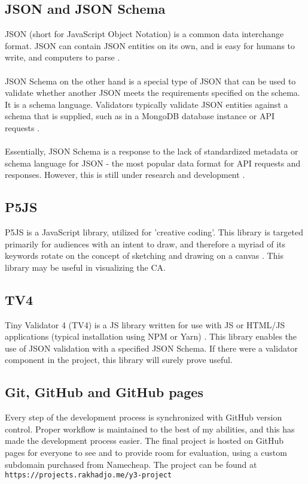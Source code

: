 \subsection{JSON and JSON Schema} \label{json_schema}
JSON (short for JavaScript Object Notation) is a common data interchange format. JSON can contain JSON entities on its own, and is easy for humans to write, and computers to parse \cite{bassett2015introduction}.
\\ \\
JSON Schema on the other hand is a special type of JSON that can be used to validate whether another JSON meets the requirements specified on the schema. It is a schema language. Validators typically validate JSON entities against a schema that is supplied, such as in a MongoDB database instance or API requests \cite{pezoa2016foundations}.
\\ \\
Essentially, JSON Schema is a response to the lack of standardized metadata or schema language for JSON - the most popular data format for API requests and responses. However, this is still under research and development \cite{pezoa2016foundations}. 

\subsection{P5JS} \label{p5js}
P5JS is a JavaScript library, utilized for ’creative coding’. This library is targeted primarily for audiences with an intent to draw, and therefore a myriad of its keywords rotate on the concept of sketching and drawing on a canvas \cite{mccarthy2015p5js}. This library may be useful in visualizing the CA.

\subsection{TV4} \label{tv4}
Tiny Validator 4 (TV4) is a JS library written for use with JS or HTML/JS applications (typical installation using NPM or Yarn) \cite{tv4}. This library enables the use of JSON validation with a specified JSON Schema. If there were a validator component in the project, this library will surely prove useful. 

\subsection{Git, GitHub and GitHub pages}
Every step of the development process is synchronized with GitHub version control. Proper workflow is maintained to the best of my abilities, and this has made the development process easier. The final project is hosted on GitHub pages for everyone to see and to provide room for evaluation, using a custom subdomain purchased from Namecheap. The project can be found at \texttt{https://projects.rakhadjo.me/y3-project}
